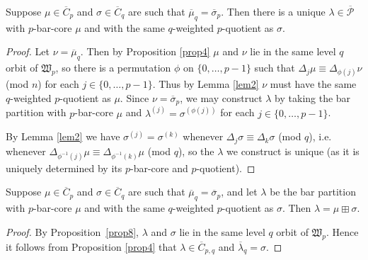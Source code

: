 \documentclass[ALCO, Unicode,published]{cedram}
\begin{document}
\begin{prop}\label{prop6}
Suppose $\mu\in\overline{C}_p$ and $\sigma\in\overline{C}_q$ are such that $\overline{\mu}_q=\overline{\sigma}_p$. Then there is a unique $\lambda\in\overline{\mathcal{P}}$ with $p$-bar-core $\mu$ and with the same $q$-weighted $p$-quotient as $\sigma$. 
\end{prop}
\begin{proof}
Let $\nu=\overline{\mu}_q$. Then by Proposition \ref{prop4} $\mu$ and $\nu$ lie in the same level $q$ orbit of $\mathfrak{W}_p$, so there is a permutation $\phi$ on $\{0,\dots,p-1\}$ such that $\Delta_j\mu\equiv\Delta_{\phi(j)}\nu$ (mod $n$) for each $j\in\{0,\dots,p-1\}$. Thus by Lemma \ref{lem2} $\nu$ must have the same $q$-weighted $p$-quotient as $\mu$. Since $\nu=\overline{\sigma}_p$, we may construct $\lambda$ by taking the bar partition with $p$-bar-core $\mu$ and $\lambda^{(j)}=\sigma^{(\phi(j))}$ for each $j\in\{0,\dots,p-1\}$. 

By Lemma \ref{lem2} we have $\sigma^{(j)}=\sigma^{(k)}$ whenever $\Delta_j\sigma\equiv\Delta_k\sigma$ (mod $q$), i.e. whenever $\Delta_{\phi^{-1}(j)}\mu\equiv\Delta_{\phi^{-1}(k)}\mu$ (mod $q$), so the $\lambda$ we construct is unique (as it is uniquely determined by its $p$-bar-core and $p$-quotient). 
\end{proof}

\begin{prop}\label{prop10}
Suppose $\mu\in\overline{C}_p$ and $\sigma\in\overline{C}_q$ are such that $\overline{\mu}_q=\overline{\sigma}_p$, and let $\lambda$ be the bar partition with $p$-bar-core $\mu$ and with the same $q$-weighted $p$-quotient as $\sigma$. Then $\lambda=\mu\boxplus\sigma$. 
\end{prop}
\begin{proof}
By Proposition~\ref{prop8}, $\lambda$ and $\sigma$ lie in the same level $q$ orbit of $\mathfrak{W}_p$. Hence it follows from Proposition \ref{prop4} that $\lambda\in\overline{C}_{p,q}$ and $\overline{\lambda}_q=\sigma$. 
\end{proof}
\end{document}
